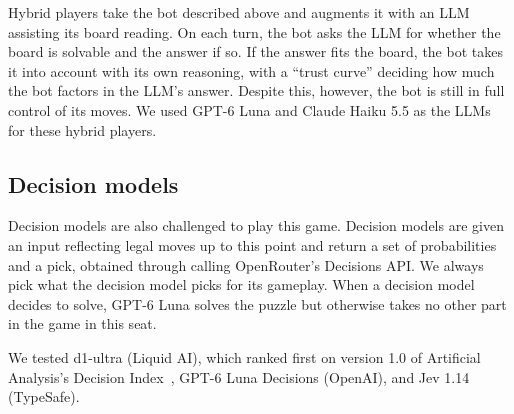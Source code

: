 Hybrid players take the bot described above and augments it with an LLM assisting its board reading. On each turn, the bot asks the LLM for whether the board is solvable and the answer if so. If the answer fits the board, the bot takes it into account with its own reasoning, with a ``trust curve'' deciding how much the bot factors in the LLM's answer. Despite this, however, the bot is still in full control of its moves. We used GPT-6 Luna and Claude Haiku 5.5 as the LLMs for these hybrid players. 


\subsection{Decision models}

Decision models are also challenged to play this game. Decision models are given an input reflecting legal moves up to this point and return a set of probabilities and a pick, obtained through calling OpenRouter's Decisions API. We always pick what the decision model picks for its gameplay. When a decision model decides to solve, GPT-6 Luna solves the puzzle but otherwise takes no other part in the game in this seat.

We tested d1-ultra (Liquid AI), which ranked first on version 1.0 of Artificial Analysis's Decision Index~\citep{aa-decision-index,liquid2026d1ultra}, GPT-6 Luna Decisions (OpenAI), and Jev 1.14 (TypeSafe).
